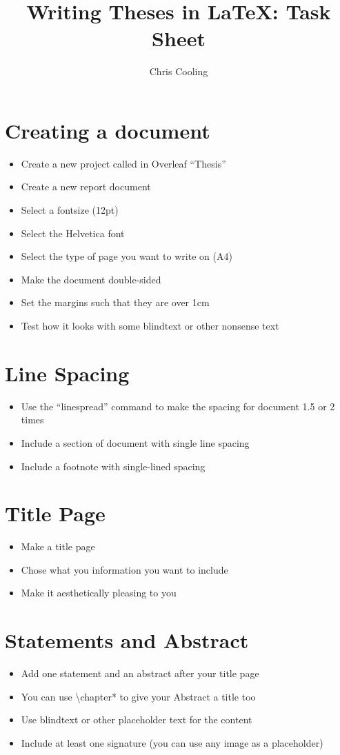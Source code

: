 \documentclass[11pt,a4paper]{article}
\begin{document}
\title{Writing Theses in \LaTeX: Task Sheet}
\author{Chris Cooling}
\maketitle
\pagestyle{empty}
\thispagestyle{empty}

\section{Creating a document}
\begin{itemize}
\item Create a new project called in Overleaf ``Thesis''
\item Create a new report document
\item Select a fontsize (12pt)
\item Select the Helvetica font
\item Select the type of page you want to write on (A4)
\item Make the document double-sided
\item Set the margins such that they are over 1cm
\item Test how it looks with some blindtext or other nonsense text
\end{itemize}

\section{Line Spacing}
\begin{itemize}
\item Use the ``linespread'' command to make the spacing for document 1.5 or 2 times
\item Include a section of document with single line spacing
\item Include a footnote with single-lined spacing
\end{itemize}

\section{Title Page}
\begin{itemize}
\item Make a title page 
\item Chose what you information you want to include
\item Make it aesthetically pleasing to you
\end{itemize}

\section{Statements and Abstract}
\begin{itemize}
\item Add one statement and an abstract after your title page
\item You can use \textbackslash chapter* to give your Abstract a title too
\item Use blindtext or other placeholder text for the content
\item Include at least one signature (you can use any image as a placeholder)
\end{itemize}
\end{document}
